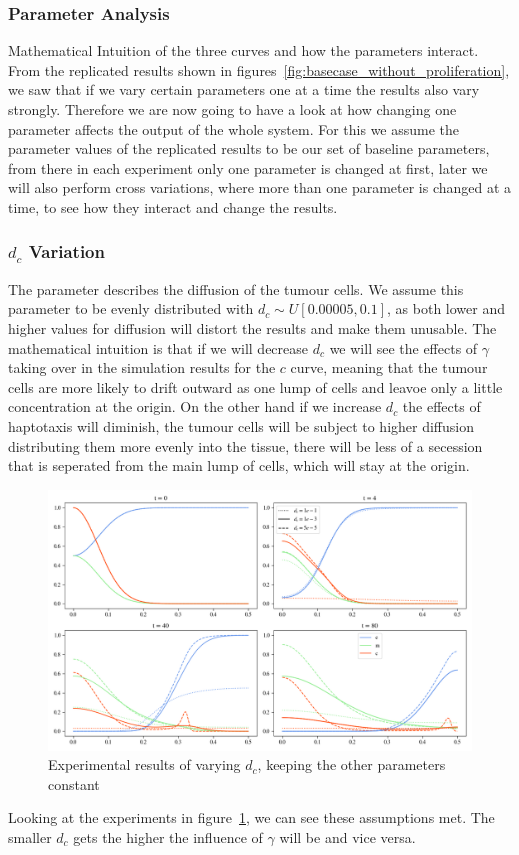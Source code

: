 \subsubsection{Parameter Analysis}

Mathematical Intuition of the three curves and how the parameters interact.\newline 
From the replicated results shown in figures~\ref{fig:basecase_without_proliferation}, we saw that if we vary certain parameters one at a time the results also vary strongly. Therefore we are now going to have a look at how changing one parameter affects the output of the whole system. For this we assume the parameter values of the replicated results to be our set of baseline parameters, from there in each experiment only one parameter is changed at first, later we will also perform cross variations, where more than one parameter is changed at a time, to see how they interact and change the results. 

\subsubsection*{$d_c$ Variation}
The parameter describes the diffusion of the tumour cells. We assume this parameter to be evenly distributed with $d_c \sim U[0.00005,0.1]$, as both lower and higher values for diffusion will distort the results and make them unusable.\newline 
The mathematical intuition is that if we will decrease $d_c$ we will see the effects of $\gamma$ taking over in the simulation results for the $c$ curve, meaning that the tumour cells are more likely to drift outward as one lump of cells and leavoe only a little concentration at the origin. On the other hand if we increase $d_c$ the effects of haptotaxis will diminish, the tumour cells will be subject to higher diffusion distributing them more evenly into the tissue, there will be less of a secession that is seperated from the main lump of cells, which will stay at the origin. 
\begin{figure}[h]
    \centering
    \includegraphics[width=\textwidth]{resources/images/dc_variation.png}
    \caption{Experimental results of varying $d_c$, keeping the other parameters constant}
    \label{fig:dc_comparison}
\end{figure}
Looking at the experiments in figure~\ref{fig:dc_comparison}, we can see these assumptions met. The smaller $d_c$ gets the higher the influence of $\gamma$ will be and vice versa. 

